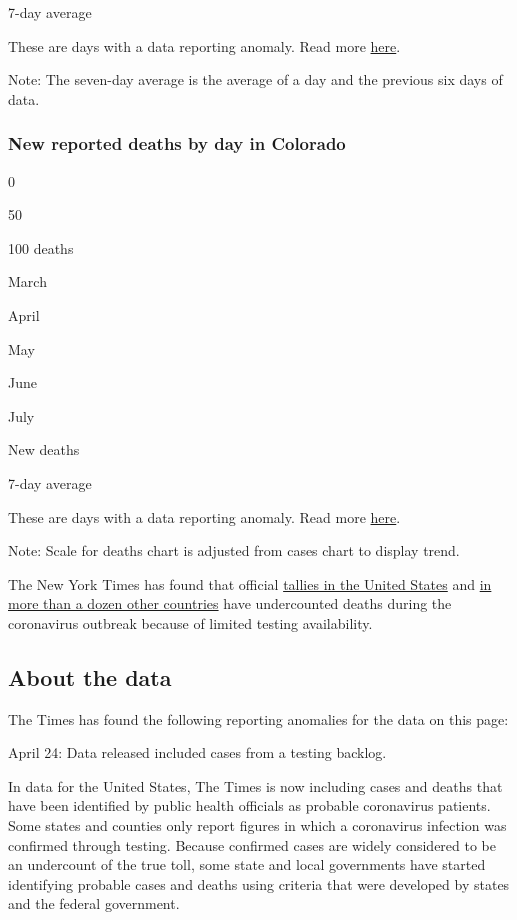 7-day average

These are days with a data reporting anomaly. Read more
\protect\hyperlink{anomaly-notes}{here}.

Note: The seven-day average is the average of a day and the previous six
days of data.

\hypertarget{new-reported-deaths-by-day-in-colorado}{%
\subsubsection{New reported deaths by day in
Colorado}\label{new-reported-deaths-by-day-in-colorado}}

0

50

100 deaths

March

April

May

June

July

New deaths

7-day average

These are days with a data reporting anomaly. Read more
\protect\hyperlink{anomaly-notes}{here}.

Note: Scale for deaths chart is adjusted from cases chart to display
trend.

The New York Times has found that official
\href{https://www.nytimes.com/interactive/2020/04/28/us/coronavirus-death-toll-total.html}{tallies
in the United States} and
\href{https://www.nytimes.com/interactive/2020/04/21/world/coronavirus-missing-deaths.html}{in
more than a dozen other countries} have undercounted deaths during the
coronavirus outbreak because of limited testing availability.

\hypertarget{about-the-data}{%
\subsection{About the data}\label{about-the-data}}

The Times has found the following reporting anomalies for the data on
this page:

April 24: Data released included cases from a testing backlog.

In data for the United States, The Times is now including cases and
deaths that have been identified by public health officials as probable
coronavirus patients. Some states and counties only report figures in
which a coronavirus infection was confirmed through testing. Because
confirmed cases are widely considered to be an undercount of the true
toll, some state and local governments have started identifying probable
cases and deaths using criteria that were developed by states and the
federal government.

